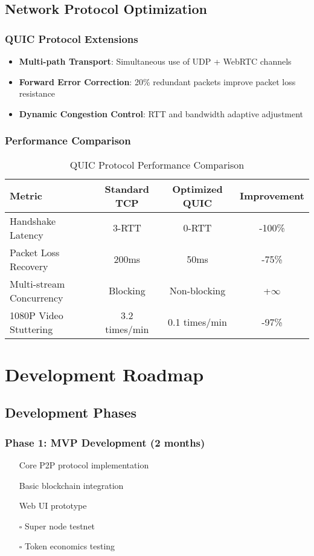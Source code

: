 \documentclass[12pt,a4paper]{article}
\newcommand{\cmark}{\ding{51}}
\begin{document}
\subsection{Network Protocol Optimization}

\subsubsection{QUIC Protocol Extensions}
\begin{itemize}
    \item \textbf{Multi-path Transport}: Simultaneous use of UDP + WebRTC channels
    \item \textbf{Forward Error Correction}: 20\% redundant packets improve packet loss resistance
    \item \textbf{Dynamic Congestion Control}: RTT and bandwidth adaptive adjustment
\end{itemize}

\subsubsection{Performance Comparison}

\begin{table}[htbp]
\centering
\begin{tabular}{|l|c|c|c|}
\hline
\textbf{Metric} & \textbf{Standard TCP} & \textbf{Optimized QUIC} & \textbf{Improvement} \\
\hline
Handshake Latency & 3-RTT & 0-RTT & -100\% \\
\hline
Packet Loss Recovery & 200ms & 50ms & -75\% \\
\hline
Multi-stream Concurrency & Blocking & Non-blocking & +$\infty$ \\
\hline
1080P Video Stuttering & 3.2 times/min & 0.1 times/min & -97\% \\
\hline
\end{tabular}
\caption{QUIC Protocol Performance Comparison}
\end{table}

\section{Development Roadmap}

\subsection{Development Phases}

\subsubsection{Phase 1: MVP Development (2 months)}
\begin{itemize}
    \item[\cmark] Core P2P protocol implementation
    \item[\cmark] Basic blockchain integration
    \item[\cmark] Web UI prototype
    \item[$\square$] Super node testnet
    \item[$\square$] Token economics testing
\end{itemize}
\end{document}
